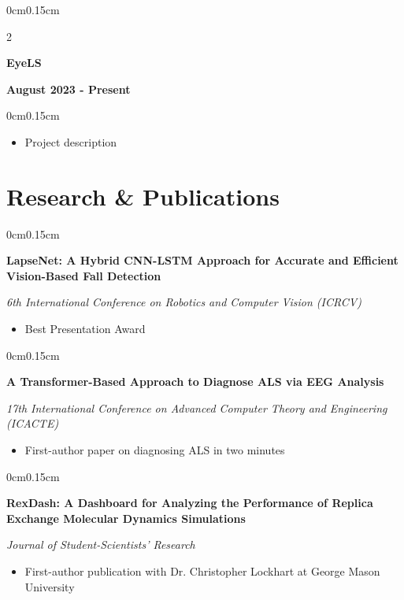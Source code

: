 \documentclass[10pt, letterpaper]{article}
\newenvironment{highlights}{
    \begin{itemize}[topsep=0pt, parsep=0pt, partopsep=0pt, itemsep=0pt, leftmargin=0.6cm]
}{
    \end{itemize}
}
\newenvironment{onecolentry}{
    \begin{adjustwidth}{0cm}{0.15cm}
}{
    \end{adjustwidth}
}
\newenvironment{twocolentry}[2][]{
    \onecolentry
    \def\secondColumn{#2}
    \setcolumnwidth{\fill, 4cm}
    \begin{paracol}{2}
}{
    \switchcolumn \raggedleft \secondColumn
    \end{paracol}
    \endonecolentry
}
\begin{document}
    \vspace{0.05cm}

    \begin{twocolentry}{\textbf{August 2023 - Present}}
        \textbf{EyeLS}
    \end{twocolentry}

    \begin{onecolentry}
        \begin{highlights}
            \item Project description
        \end{highlights}
    \end{onecolentry}

    \vspace{0.05cm}
    \section{Research \& Publications}
    \vspace{0.1cm}

    \begin{onecolentry}
        \textbf{LapseNet: A Hybrid CNN-LSTM Approach for Accurate and Efficient Vision-Based Fall Detection}
        
        \textit{6th International Conference on Robotics and Computer Vision (ICRCV)}
        \begin{highlights}
            \item Best Presentation Award
        \end{highlights}
    \end{onecolentry}

    \vspace{0.05cm}


    \begin{onecolentry}
        \textbf{A Transformer-Based Approach to Diagnose ALS via EEG Analysis}
        
        \textit{17th International Conference on Advanced Computer Theory and Engineering (ICACTE)}
        \begin{highlights}
            \item First-author paper on diagnosing ALS in two minutes
        \end{highlights}
    \end{onecolentry}

    \vspace{0.05cm}

    \begin{onecolentry}
        \textbf{RexDash: A Dashboard for Analyzing the Performance of Replica Exchange Molecular Dynamics Simulations}
        
        \textit{Journal of Student-Scientists' Research}
        \begin{highlights}
            \item First-author publication with Dr. Christopher Lockhart at George Mason University
        \end{highlights}
    \end{onecolentry}
\end{document}
